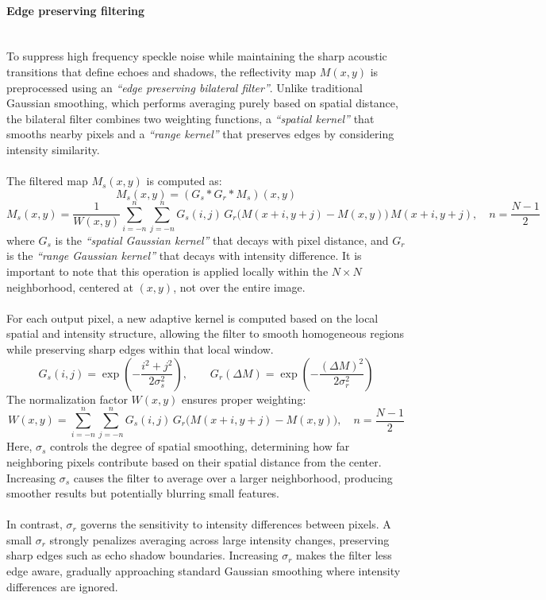 \newpage

\paragraph{Edge preserving filtering} \mbox{}\\[0.5em] \noindent
To suppress high frequency speckle noise while maintaining the sharp acoustic transitions that define echoes and shadows, the reflectivity map $M(x,y)$ is preprocessed using an \textit{``edge preserving bilateral filter''}. Unlike traditional Gaussian smoothing, which performs averaging purely based on spatial distance, the bilateral filter combines two weighting functions, a \textit{``spatial kernel''} that smooths nearby pixels and a \textit{``range kernel''} that preserves edges by considering intensity similarity.  
\\ \\
The filtered map $M_s(x,y)$ is computed as:
$$
    M_s(x,y) = (G_s * G_r * M_s)(x,y)
$$
$$
    M_s(x,y) = \frac{1}{W(x,y)} 
    \sum_{i=-n}^{n} \sum_{j=-n}^{n}
    G_s(i,j)\, G_r\big(M(x+i,y+j) - M(x,y)\big)\, M(x+i,y+j),
    \quad n = \frac{N-1}{2}
$$
where $G_s$ is the \textit{``spatial Gaussian kernel''} that decays with pixel distance, and $G_r$ is the \textit{``range Gaussian kernel''} that decays with intensity difference. It is important to note that this operation is applied locally within the $N \times N$ neighborhood, centered at $(x,y)$, not over the entire image.
\\ \\  
For each output pixel, a new adaptive kernel is computed based on the local spatial and intensity structure, allowing the filter to smooth homogeneous regions while preserving sharp edges within that local window.
$$
    G_s(i,j) = \exp\!\left(-\frac{i^2 + j^2}{2\sigma_s^2}\right),
    \qquad
    G_r(\Delta M) = \exp\!\left(-\frac{(\Delta M)^2}{2\sigma_r^2}\right)
$$
The normalization factor $W(x,y)$ ensures proper weighting:
$$
    W(x,y) = \sum_{i=-n}^{n} \sum_{j=-n}^{n}
    G_s(i,j)\, G_r\big(M(x+i,y+j) - M(x,y)\big), 
    \quad n = \frac{N-1}{2}
$$
Here, $\sigma_s$ controls the degree of spatial smoothing, determining how far neighboring pixels contribute based on their spatial distance from the center. Increasing $\sigma_s$ causes the filter to average over a larger neighborhood, producing smoother results but potentially blurring small features.  
\\ \\
In contrast, $\sigma_r$ governs the sensitivity to intensity differences between pixels. A small $\sigma_r$ strongly penalizes averaging across large intensity changes, preserving sharp edges such as echo shadow boundaries. Increasing $\sigma_r$ makes the filter less edge aware, gradually approaching standard Gaussian smoothing where intensity differences are ignored.
